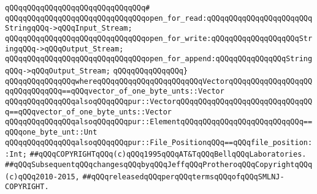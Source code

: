 \verb|qQQqqQQqqQQqqQQqqQQqqQQqqQQqqQQq#|\newline
\verb|qQQqqQQqqQQqqQQqqQQqqQQqqQQqqQQqopen_for_read:qQQqqQQqqQQqqQQqqQQqqQQqStringqQQq->qQQqInput_Stream;|\newline
\verb|qQQqqQQqqQQqqQQqqQQqqQQqqQQqqQQqopen_for_write:qQQqqQQqqQQqqQQqqQQqStringqQQq->qQQqOutput_Stream;|\newline
\verb|qQQqqQQqqQQqqQQqqQQqqQQqqQQqqQQqopen_for_append:qQQqqQQqqQQqqQQqStringqQQq->qQQqOutput_Stream;|\newline
\verb|qQQqqQQqqQQqqQQq}|\newline
\verb|qQQqqQQqqQQqqQQqwhereqQQqqQQqqQQqqQQqqQQqqQQqVectorqQQqqQQqqQQqqQQqqQQqqQQqqQQqqQQq==qQQqvector_of_one_byte_unts::Vector|\newline
\verb|qQQqqQQqqQQqqQQqalsoqQQqqQQqpur::VectorqQQqqQQqqQQqqQQqqQQqqQQqqQQqqQQq==qQQqvector_of_one_byte_unts::Vector|\newline
\verb|qQQqqQQqqQQqqQQqalsoqQQqqQQqpur::ElementqQQqqQQqqQQqqQQqqQQqqQQqqQQq==qQQqone_byte_unt::Unt|\newline
\verb|qQQqqQQqqQQqqQQqalsoqQQqqQQqpur::File_PositionqQQq==qQQqfile_position::Int;|\newline
\newline
\newline
\newline
\verb|##qQQqCOPYRIGHTqQQq(c)qQQq1995qQQqAT&TqQQqBellqQQqLaboratories.|\newline
\verb|##qQQqSubsequentqQQqchangesqQQqbyqQQqJeffqQQqProtheroqQQqCopyrightqQQq(c)qQQq2010-2015,|\newline
\verb|##qQQqreleasedqQQqperqQQqtermsqQQqofqQQqSMLNJ-COPYRIGHT.|\newline

